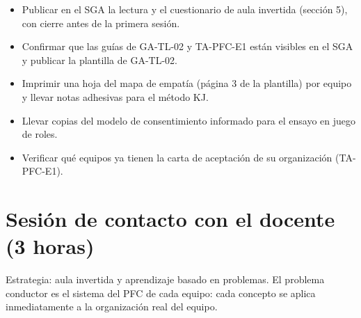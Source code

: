 \documentclass[11pt]{article}
\newcommand{\seccion}[1]{\section{\textcolor{utegreendk}{#1}}}
\newcommand{\caja}{$\square$}
\begin{document}
\begin{cajaclave}[title={Lista de verificación antes del lunes 16}]
	\begin{itemize}[leftmargin=18pt,itemsep=2pt,label=\caja]
		\item Publicar en el SGA la lectura y el cuestionario de aula invertida (sección 5), con cierre antes de la primera sesión.
		\item Confirmar que las guías de GA-TL-02 y TA-PFC-E1 están visibles en el SGA y publicar la plantilla de GA-TL-02.
		\item Imprimir una hoja del mapa de empatía (página 3 de la plantilla) por equipo y llevar notas adhesivas para el método KJ.
		\item Llevar copias del modelo de consentimiento informado para el ensayo en juego de roles.
		\item Verificar qué equipos ya tienen la carta de aceptación de su organización (TA-PFC-E1).
	\end{itemize}
\end{cajaclave}

\seccion{Sesión de contacto con el docente (3 horas)}

Estrategia: aula invertida y aprendizaje basado en problemas. El problema conductor es el sistema del PFC de cada equipo: cada concepto se aplica inmediatamente a la organización real del equipo.
\end{document}
